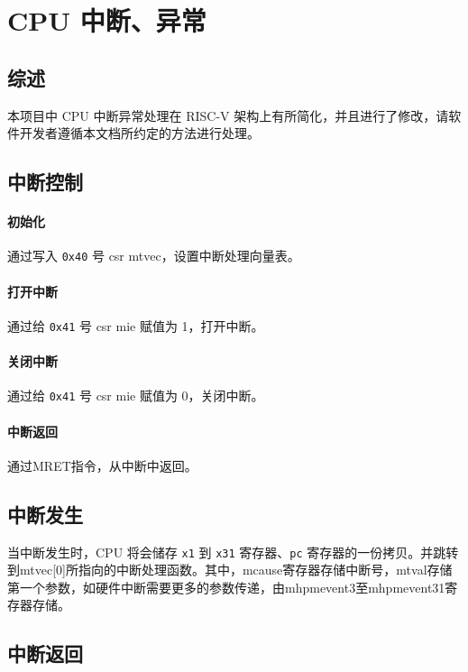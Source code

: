 
\chapter{CPU 中断、异常}

\section{综述}
本项目中 CPU 中断异常处理在 RISC-V 架构上有所简化，并且进行了修改，请软件开发者遵循本文档所约定的方法进行处理。

\section{中断控制}

\subsubsection{初始化}
通过写入 \texttt{0x40} 号 csr mtvec，设置中断处理向量表。

\subsubsection{打开中断}
通过给 \texttt{0x41} 号 csr mie 赋值为 1，打开中断。

\subsubsection{关闭中断}
通过给 \texttt{0x41} 号 csr mie 赋值为 0，关闭中断。

\subsubsection{中断返回}
通过MRET指令，从中断中返回。

\section{中断发生}

当中断发生时，CPU 将会储存 \texttt{x1} 到 \texttt{x31} 寄存器、\texttt{pc} 寄存器的一份拷贝。并跳转到mtvec[0]所指向的中断处理函数。其中，mcause寄存器存储中断号，mtval存储第一个参数，如硬件中断需要更多的参数传递，由mhpmevent3至mhpmevent31寄存器存储。

\section{中断返回}


